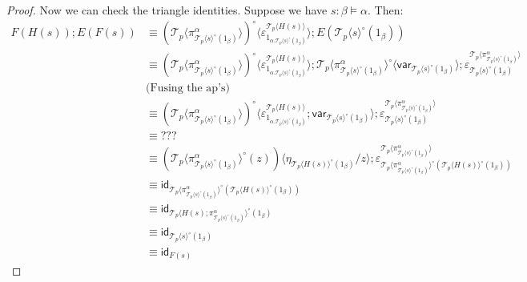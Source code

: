 \documentclass[10pt]{article}
\theoremstyle{definition}
\newcommand\TrCirc[2]{\ensuremath{{#1}^\circ(#2)}}
\newcommand\var[1]{\ensuremath{\mathsf{var}_{#1}}}
\newcommand{\id}{\mathsf{id}}
\newcommand\ApEl[2]{\mathcal{T}_{#1}\langle#2\rangle}
\newcommand\ap[2]{\ensuremath{#1 \langle #2 \rangle }}
\begin{document}
\begin{proof}
Now we can check the triangle identities. Suppose we have $s : \beta \vDash \alpha$. Then:
\begin{align*}
F(H(s)) ; E(F(s))
&\equiv \ap{(\ApEl{p}{\pi^\alpha_{\TrCirc{\ApEl{p}{s}}{1_\beta}}})^\circ}{\varepsilon^{\ApEl{p}{H(s)}}_{1_{\alpha.\TrCirc{\ApEl{p}{s}}{1_\beta}}}} ; E(\TrCirc{\ApEl{p}{s}}{1_\beta}) \\
&\equiv \ap{(\ApEl{p}{\pi^\alpha_{\TrCirc{\ApEl{p}{s}}{1_\beta}}})^\circ}{\varepsilon^{\ApEl{p}{H(s)}}_{1_{\alpha.\TrCirc{\ApEl{p}{s}}{1_\beta}}}} ; \ap{\ApEl{p}{\pi^\alpha_{\TrCirc{\ApEl{p}{s}}{1_\beta}}}^\circ}{\var{\TrCirc{\ApEl{p}{s}}{1_\beta}}};\varepsilon^{\ApEl{p}{\pi^\alpha_{\TrCirc{\ApEl{p}{s}}{1_\beta}}}}_{\TrCirc{\ApEl{p}{s}}{1_\beta}} \\
&\text{(Fusing the ap's)} \\
&\equiv \ap{(\ApEl{p}{\pi^\alpha_{\TrCirc{\ApEl{p}{s}}{1_\beta}}})^\circ}{\varepsilon^{\ApEl{p}{H(s)}}_{1_{\alpha.\TrCirc{\ApEl{p}{s}}{1_\beta}}}; \var{\TrCirc{\ApEl{p}{s}}{1_\beta}}} ;\varepsilon^{\ApEl{p}{\pi^\alpha_{\TrCirc{\ApEl{p}{s}}{1_\beta}}}}_{\TrCirc{\ApEl{p}{s}}{1_\beta}} \\
&\equiv ??? \\
&\equiv \ap{(\TrCirc{\ApEl{p}{\pi^\alpha_{\TrCirc{\ApEl{p}{s}}{1_\beta}}}}{z})}{\eta_{\TrCirc{\ApEl{p}{H(s)}}{1_\beta}}/z};\varepsilon^{\ApEl{p}{\pi^\alpha_{\TrCirc{\ApEl{p}{s}}{1_\beta}}}}_{\TrCirc{\ApEl{p}{\pi^\alpha_{\TrCirc{\ApEl{p}{s}}{1_\beta}}}}{\TrCirc{\ApEl{p}{H(s)}}{1_\beta}}} \\
&\equiv \id_{\TrCirc{\ApEl{p}{\pi^\alpha_{\TrCirc{\ApEl{p}{s}}{1_\beta}}}}{\TrCirc{\ApEl{p}{H(s)}}{1_\beta}}} \\
&\equiv \id_{\TrCirc{\ApEl{p}{H(s);\pi^\alpha_{\TrCirc{\ApEl{p}{s}}{1_\beta}}}}{1_\beta}} \\
&\equiv \id_{\TrCirc{\ApEl{p}{s}}{1_\beta}} \\
&\equiv \id_{F(s)}
\end{align*}


\end{proof}
\end{document}
